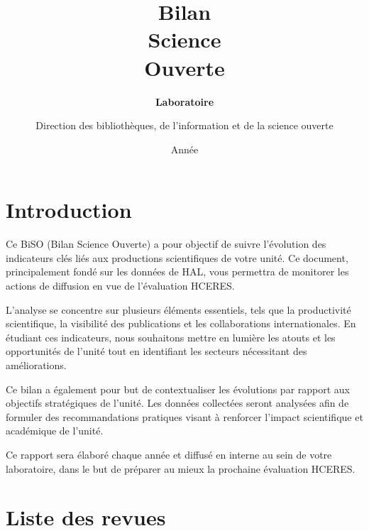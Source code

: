 \documentclass[french, 11pt]{../../dibiso/biso}
\title{Bilan \\ Science \\ Ouverte}
\author{Direction des bibliothèques, de l’information et de la science ouverte}
\date{Année \reportyear}
\subtitle{\textbf{Laboratoire \labacronym} \\
  \medskip
  \labfullname
}
\begin{document}
\renewcommand{\arraystretch}{1.5}






\maketitle

\tableofcontents

\pagebreak



\section{Introduction}

Ce BiSO (Bilan Science Ouverte) a pour objectif de suivre l'évolution des indicateurs clés liés aux productions scientifiques de votre unité. Ce document, principalement fondé sur les données de HAL, vous permettra de monitorer les actions de diffusion en vue de l'évaluation HCERES.

L'analyse se concentre sur plusieurs éléments essentiels, tels que la productivité scientifique, la visibilité des publications et les collaborations internationales. En étudiant ces indicateurs, nous souhaitons mettre en
lumière les atouts et les opportunités de l'unité tout en identifiant les secteurs nécessitant des améliorations.

Ce bilan a également pour but de contextualiser les évolutions par rapport aux objectifs stratégiques de l'unité. Les données collectées seront analysées afin de formuler des recommandations pratiques visant à renforcer l'impact
scientifique et académique de l'unité.

Ce rapport sera élaboré chaque année et diffusé en interne au sein de votre laboratoire, dans le but de préparer au mieux la prochaine évaluation HCERES.



\pagebreak

\section{Liste des revues}
\end{document}
